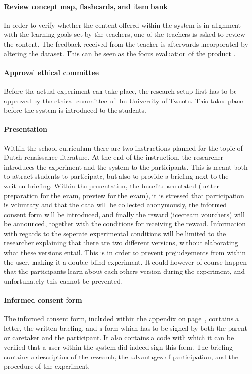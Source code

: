 \paragraph{Review concept map, flashcards, and item bank} In order to verify whether the content offered within the system is in alignment with the learning goals set by the teachers, one of the teachers is asked to review the content. The feedback received from the teacher is afterwards incorporated by altering the dataset. This can be seen as the focus evaluation of the product \cite{slo}.

\paragraph{Approval ethical committee} Before the actual experiment can take place, the research setup first has to be approved by the ethical committee of the University of Twente. This takes place before the system is introduced to the students.

\paragraph{Presentation} Within the school curriculum there are two instructions planned for the topic of Dutch renaissance literature. At the end of the instruction, the researcher introduces the experiment and the system to the participants. This is meant both to attract students to participate, but also to provide a briefing next to the written briefing. Within the presentation, the benefits are stated (better preparation for the exam, preview for the exam), it is stressed that participation is voluntary and that the data will be collected anonymously, the informed consent form will be introduced, and finally the reward (icecream vourchers) will be announced, together with the conditions for receiving the reward. Information with regards to the seperate experimental conditions will be limited to the researcher explaining that there are two different versions, without elaborating what these versions entail. This is in order to prevent prejudgements from within the user, making it a double-blind experiment. It could however of course happen that the participants learn about each others version during the experiment, and unfortunately this cannot be prevented.

\paragraph{Informed consent form} The informed consent form, included within the  appendix on page~\pageref{app:consentform}, contains a letter, the written briefing, and a form which has to be signed by both the parent or caretaker and the participant. It also contains a code with which it can be verified that a user within the system did indeed sign this form. The briefing contains a description of the research, the advantages of participation, and the procedure of the experiment.

